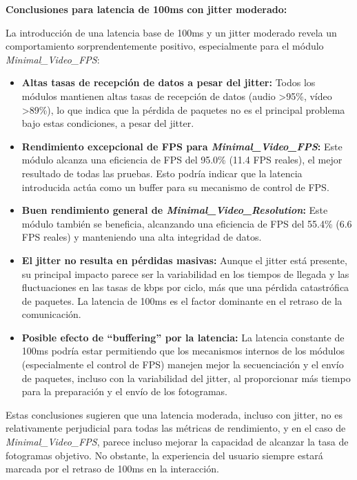 \vspace{\baselineskip}

\textbf{Conclusiones para latencia de 100ms con jitter moderado:}

La introducción de una latencia base de 100ms y un jitter moderado revela un comportamiento sorprendentemente positivo, especialmente para el módulo \textit{Minimal\_Video\_FPS}:

\begin{itemize}
\item \textbf{Altas tasas de recepción de datos a pesar del jitter:} Todos los módulos mantienen altas tasas de recepción de datos (audio >95\%, vídeo >89\%), lo que indica que la pérdida de paquetes no es el principal problema bajo estas condiciones, a pesar del jitter.
\item \textbf{Rendimiento excepcional de FPS para \textit{Minimal\_Video\_FPS}:} Este módulo alcanza una eficiencia de FPS del 95.0\% (11.4 FPS reales), el mejor resultado de todas las pruebas. Esto podría indicar que la latencia introducida actúa como un buffer para su mecanismo de control de FPS.
\item \textbf{Buen rendimiento general de \textit{Minimal\_Video\_Resolution}:} Este módulo también se beneficia, alcanzando una eficiencia de FPS del 55.4\% (6.6 FPS reales) y manteniendo una alta integridad de datos.
\item \textbf{El jitter no resulta en pérdidas masivas:} Aunque el jitter está presente, su principal impacto parece ser la variabilidad en los tiempos de llegada y las fluctuaciones en las tasas de kbps por ciclo, más que una pérdida catastrófica de paquetes. La latencia de 100ms es el factor dominante en el retraso de la comunicación.
\item \textbf{Posible efecto de ``buffering'' por la latencia:} La latencia constante de 100ms podría estar permitiendo que los mecanismos internos de los módulos (especialmente el control de FPS) manejen mejor la secuenciación y el envío de paquetes, incluso con la variabilidad del jitter, al proporcionar más tiempo para la preparación y el envío de los fotogramas.
\end{itemize}

Estas conclusiones sugieren que una latencia moderada, incluso con jitter, no es relativamente perjudicial para todas las métricas de rendimiento, y en el caso de \textit{Minimal\_Video\_FPS}, parece incluso mejorar la capacidad de alcanzar la tasa de fotogramas objetivo. No obstante, la experiencia del usuario siempre estará marcada por el retraso de 100ms en la interacción.

